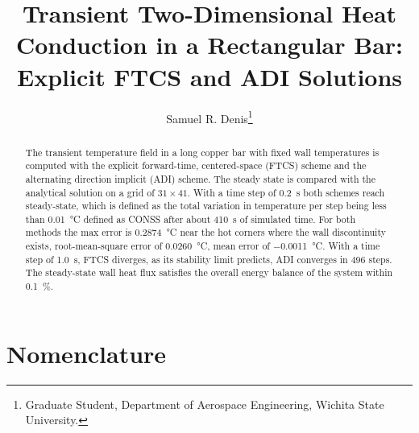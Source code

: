 \documentclass[conf]{new-aiaa}
\title{Transient Two-Dimensional Heat Conduction in a Rectangular Bar:\\ Explicit FTCS and ADI Solutions}
\author{Samuel R. Denis\footnote{Graduate Student, Department of Aerospace Engineering, Wichita State University.}}
\affil{Department of Aerospace Engineering, Wichita State University, Wichita, Kansas, 67260}
\begin{document}
\maketitle

\begin{abstract}
The transient temperature field in a long copper bar with fixed wall temperatures is 
computed with the explicit forward-time, centered-space (FTCS) scheme and 
the alternating direction implicit (ADI) scheme.
The steady state is compared with the analytical solution on a grid of $31 \times 41$.
With a time step of \SI{0.2}{\second} both schemes reach steady-state, which is defined as the total variation in
temperature per step being less than \SI{0.01}{\degreeCelsius} 
defined as CONSS after about \SI{410}{\second} of simulated time.
For both methods the max error is \SI{0.2874}{\degreeCelsius} near the hot corners where the wall discontinuity exists, 
root-mean-square error of \SI{0.0260}{\degreeCelsius}, mean error of \SI{-0.0011}{\degreeCelsius}.
With a time step of \SI{1.0}{\second}, FTCS diverges, as its stability limit predicts, ADI converges in 496 steps. 
The steady-state wall heat flux satisfies the overall energy balance of the system within \SI{0.1}{\percent}.
\end{abstract}

\section*{Nomenclature}
\end{document}
